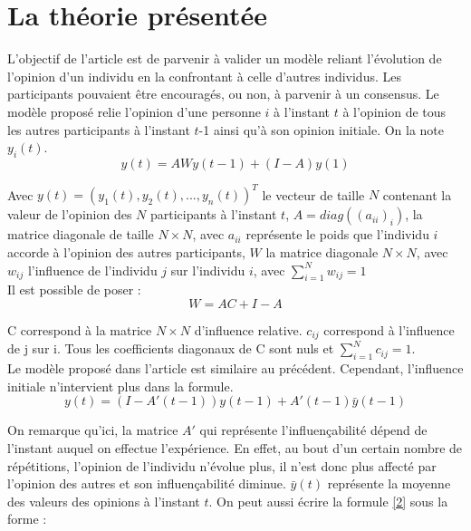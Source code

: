 \documentclass{scrreprt}
\begin{document}
\section{La théorie présentée}

L’objectif de l'article \cite{FJ} est de parvenir à valider un modèle reliant l’évolution de l’opinion d’un individu en la confrontant à celle d’autres individus. Les participants pouvaient être encouragés, ou non, à parvenir à un consensus. Le modèle proposé relie l’opinion d’une personne $i$ à l’instant $t$ à l’opinion de tous les autres participants à l’instant $t$-1 ainsi qu’à son opinion initiale. On la note $y_i(t)$.\\

\begin{equation}
\label{1}
y(t) =AWy(t-1)+(I-A)y(1) 
\end{equation}

Avec $y(t)=(y_1(t), y_2(t), ... , y_n(t))^T$ le vecteur de taille $N$ contenant la valeur de l’opinion des $N$ participants à l’instant $t$, $A=diag((a_{ii})_i)$, la matrice diagonale de taille $N\times N$, avec $a_{ii}$ représente le poids que l'individu $i$ accorde à l'opinion des autres participants, $W$ la matrice diagonale $N\times N$, avec $w_{ij}$ l’influence de l’individu $j$ sur l’individu $i$, avec $\sum_{i=1}^{N} w_{ij} = 1$ \\

 Il est possible de poser :\\
\begin{equation}
\label{WC}
 W=AC+I-A
\end{equation}

C correspond à la matrice $N \times N$ d'influence relative. $c_{ij}$ correspond à l'influence de j sur i. Tous les coefficients diagonaux de C sont nuls et $\sum_{i=1}^{N} c_{ij} = 1$. \\

Le modèle proposé dans l'article \cite{VMG} est similaire au précédent. Cependant, l’influence initiale n'intervient plus dans la formule.\\

\begin{equation}
\label{2}
y(t) =(I-A'(t-1))y(t-1)+A'(t-1)\bar{y}(t-1) 
\end{equation}

On remarque qu’ici, la matrice $A'$ qui représente l'influençabilité dépend de l’instant auquel on effectue l’expérience. En effet, au bout d'un certain nombre de répétitions, l'opinion de l'individu n'évolue plus, il n'est donc plus affecté par l'opinion des autres et son influençabilité diminue. $\bar{y}(t)$ représente la moyenne des valeurs des opinions à l’instant $t$. On peut aussi écrire la formule \ref{2} sous la forme :
\end{document}
